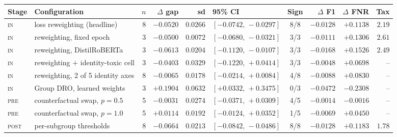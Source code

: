 \begin{tabular}{llrrrlcrrr}
\toprule
Stage & Configuration & $n$ & $\Delta$ gap & sd & 95\% CI & Sign & $\Delta$ F1 & $\Delta$ FNR & Tax \\
\midrule
\textsc{in} & loss reweighting (headline) & 8 & $-0.0520$ & $0.0266$ & $[-0.0742,\,-0.0297]$ & 8/8 & $-0.0128$ & $+0.1138$ & $2.19$ \\
\textsc{in} & reweighting, fixed epoch & 3 & $-0.0500$ & $0.0072$ & $[-0.0680,\,-0.0321]$ & 3/3 & $-0.0111$ & $+0.1306$ & $2.61$ \\
\textsc{in} & reweighting, DistilRoBERTa & 3 & $-0.0613$ & $0.0204$ & $[-0.1120,\,-0.0107]$ & 3/3 & $-0.0168$ & $+0.1526$ & $2.49$ \\
\textsc{in} & reweighting $+$ identity-toxic cell & 3 & $-0.0403$ & $0.0329$ & $[-0.1220,\,+0.0414]$ & 3/3 & $-0.0048$ & $+0.0698$ & -- \\
\textsc{in} & reweighting, 2 of 5 identity axes & 8 & $-0.0065$ & $0.0178$ & $[-0.0214,\,+0.0084]$ & 4/8 & $-0.0088$ & $+0.0830$ & -- \\
\textsc{in} & Group DRO, learned weights & 3 & $+0.1904$ & $0.0632$ & $[+0.0332,\,+0.3475]$ & 0/3 & $-0.0472$ & $-0.2308$ & -- \\
\addlinespace
\textsc{pre} & counterfactual swap, $p=0.5$ & 5 & $-0.0031$ & $0.0274$ & $[-0.0371,\,+0.0309]$ & 4/5 & $-0.0014$ & $-0.0016$ & -- \\
\textsc{pre} & counterfactual swap, $p=1.0$ & 5 & $+0.0114$ & $0.0192$ & $[-0.0124,\,+0.0352]$ & 1/5 & $-0.0069$ & $+0.0450$ & -- \\
\addlinespace
\textsc{post} & per-subgroup thresholds & 8 & $-0.0664$ & $0.0213$ & $[-0.0842,\,-0.0486]$ & 8/8 & $-0.0128$ & $+0.1183$ & $1.78$ \\
\bottomrule
\end{tabular}
